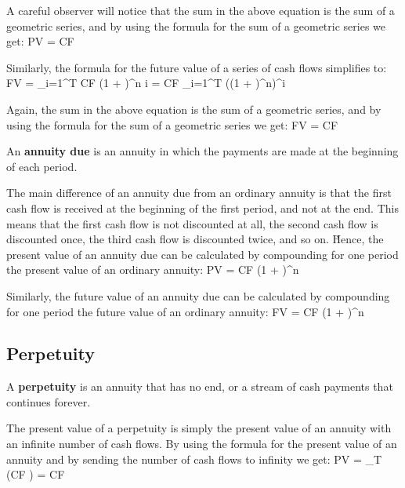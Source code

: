 A careful observer will notice that the sum in the above equation is the sum of a geometric series, and by using the
formula for the sum of a geometric series we get:
\bse
PV = CF \cdot {}
\ese

Similarly, the formula for the future value of a series of cash flows simplifies to:
\bse
FV = \sum_{i=1}^T CF \cdot (1 + )^{n \cdot i} = CF \cdot \sum_{i=1}^T \Big((1 + )^n\Big)^i
\ese

Again, the sum in the above equation is the sum of a geometric series, and by using the formula for the sum of a
geometric series we get:
\bse
FV = CF \cdot {}
\ese

An \textbf{annuity due} is an annuity in which the payments are made at the beginning of each period.
\ed


The main difference of an annuity due from an ordinary annuity is that the first cash flow is received at the beginning
of the first period, and not at the end. This means that the first cash flow is not discounted at all, the second cash
flow is discounted once, the third cash flow is discounted twice, and so on. \v

Hence, the present value of an annuity due can be calculated by compounding for one period the present value of an
ordinary annuity:
\bse
PV = CF \cdot {} \cdot (1 + )^{n}
\ese

Similarly, the future value of an annuity due can be calculated by compounding for one period the future value of an
ordinary annuity:
\bse
FV = CF \cdot {} \cdot (1 + )^{n}
\ese

\subsection{Perpetuity}

\bd[Perpetuity]
A \textbf{perpetuity} is an annuity that has no end, or a stream of cash payments that continues forever.
\ed

The present value of a perpetuity is simply the present value of an annuity with an infinite number of cash flows.
By using the formula for the present value of an annuity and by sending the number of cash flows to infinity we get:
\bse
PV = \lim_{T \to \infty} \Big(CF \cdot {}\Big) = CF \cdot {}
\ese

